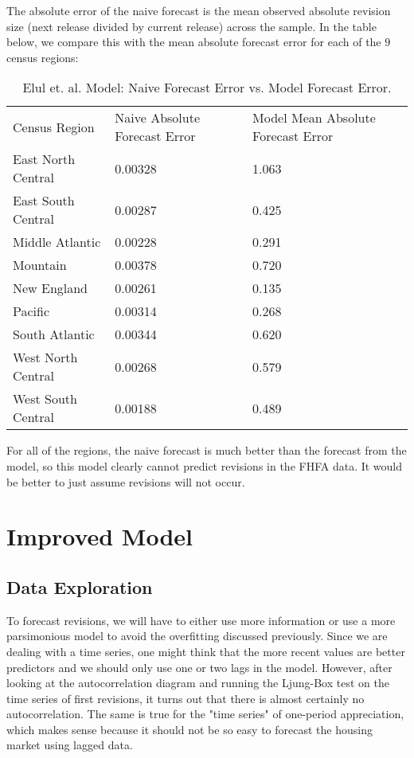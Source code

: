 \documentclass[AER]{AEA}
\begin{document}
The absolute error of the naive forecast is the mean observed absolute revision size (next release divided by current release) across the sample. In the table below, we compare this with the mean absolute forecast error for each of the $9$ census regions:

\begin{table}
\caption{Elul et. al. Model: Naive Forecast Error vs. Model Forecast Error.}

\begin{tabular}{lll}
Census Region & Naive Absolute Forecast Error & Model Mean Absolute Forecast Error \\ 
East North Central & 0.00328 & 1.063 \\ 
East South Central & 0.00287 & 0.425 \\
Middle Atlantic & 0.00228 & 0.291 \\
Mountain & 0.00378 & 0.720 \\
New England & 0.00261 & 0.135 \\
Pacific & 0.00314 & 0.268 \\
South Atlantic & 0.00344 & 0.620 \\
West North Central & 0.00268 & 0.579 \\
West South Central & 0.00188 & 0.489
\end{tabular}
\end{table}

For all of the regions, the naive forecast is much better than the forecast from the model, so this model clearly cannot predict revisions in the FHFA data. It would be better to just assume revisions will not occur.

\section{Improved Model}

\subsection{Data Exploration}

To forecast revisions, we will have to either use more information or use a more parsimonious model to avoid the overfitting discussed previously. Since we are dealing with a time series, one might think that the more recent values are better predictors and we should only use one or two lags in the model. However, after looking at the autocorrelation diagram and running the Ljung-Box test on the time series of first revisions, it turns out that there is almost certainly no autocorrelation. The same is true for the "time series" of one-period appreciation, which makes sense because it should not be so easy to forecast the housing market using lagged data. 
\end{document}
